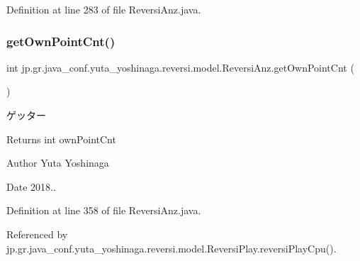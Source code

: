 Definition at line 283 of file Reversi\+Anz.\+java.

\mbox{\label{classjp_1_1gr_1_1java__conf_1_1yuta__yoshinaga_1_1reversi_1_1model_1_1_reversi_anz_a3579aecd3696d9d48da7940422a03dc9}} 
\subsubsection{\texorpdfstring{get\+Own\+Point\+Cnt()}{getOwnPointCnt()}}
{\footnotesize\ttfamily int jp.\+gr.\+java\+\_\+conf.\+yuta\+\_\+yoshinaga.\+reversi.\+model.\+Reversi\+Anz.\+get\+Own\+Point\+Cnt (\begin{DoxyParamCaption}{ }\end{DoxyParamCaption})}



ゲッター 

\begin{DoxyReturn}{Returns}
int own\+Point\+Cnt 
\end{DoxyReturn}
\begin{DoxyAuthor}{Author}
Yuta Yoshinaga 
\end{DoxyAuthor}
\begin{DoxyDate}{Date}
2018.. 
\end{DoxyDate}


Definition at line 358 of file Reversi\+Anz.\+java.



Referenced by jp.\+gr.\+java\+\_\+conf.\+yuta\+\_\+yoshinaga.\+reversi.\+model.\+Reversi\+Play.\+reversi\+Play\+Cpu().

